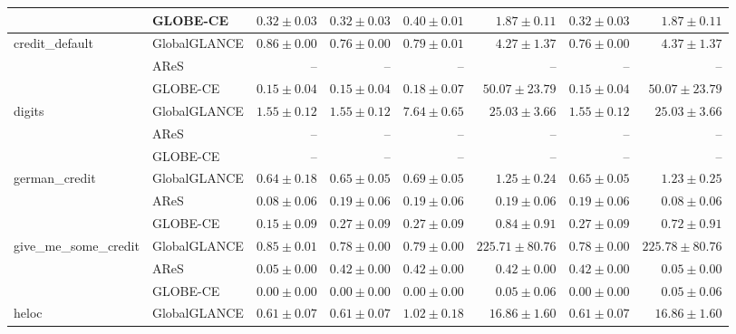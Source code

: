 \begin{table}[ht]
\begin{center}
\begin{sc}
\begin{scriptsize}
\begin{tabular}{l|l|rrrrrr}
 & GLOBE-CE & $\boldsymbol{0.32\pm{0.03}}$ & $\boldsymbol{0.32\pm{0.03}}$ & $\boldsymbol{0.40\pm{0.01}}$ & $\boldsymbol{1.87\pm{0.11}}$ & $\boldsymbol{0.32\pm{0.03}}$ & $\boldsymbol{1.87\pm{0.11}}$ \\
\midrule
\multirow{3}{*}{credit\_default} & GlobalGLANCE & $0.86\pm{0.00}$ & $0.76\pm{0.00}$ & $0.79\pm{0.01}$ & $\boldsymbol{4.27\pm{1.37}}$ & $0.76\pm{0.00}$ & $\boldsymbol{4.37\pm{1.37}}$ \\
 & AReS & -- & -- & -- & -- & -- & -- \\
 & GLOBE-CE & $\boldsymbol{0.15\pm{0.04}}$ & $\boldsymbol{0.15\pm{0.04}}$ & $\boldsymbol{0.18\pm{0.07}}$ & $50.07\pm{23.79}$ & $\boldsymbol{0.15\pm{0.04}}$ & $50.07\pm{23.79}$ \\
\midrule
\multirow{3}{*}{digits} & GlobalGLANCE & $\boldsymbol{1.55\pm{0.12}}$ & $\boldsymbol{1.55\pm{0.12}}$ & $\boldsymbol{7.64\pm{0.65}}$ & $\boldsymbol{25.03\pm{3.66}}$ & $\boldsymbol{1.55\pm{0.12}}$ & $\boldsymbol{25.03\pm{3.66}}$ \\
 & AReS & -- & -- & -- & -- & -- & -- \\
 & GLOBE-CE & -- & -- & -- & -- & -- & -- \\
\midrule
\multirow{3}{*}{german\_credit} & GlobalGLANCE & $0.64\pm{0.18}$ & $0.65\pm{0.05}$ & $0.69\pm{0.05}$ & $1.25\pm{0.24}$ & $0.65\pm{0.05}$ & $1.23\pm{0.25}$ \\
 & AReS & $\boldsymbol{0.08\pm{0.06}}$ & $\boldsymbol{0.19\pm{0.06}}$ & $\boldsymbol{0.19\pm{0.06}}$ & $\boldsymbol{0.19\pm{0.06}}$ & $\boldsymbol{0.19\pm{0.06}}$ & $\boldsymbol{0.08\pm{0.06}}$ \\
 & GLOBE-CE & $0.15\pm{0.09}$ & $0.27\pm{0.09}$ & $0.27\pm{0.09}$ & $0.84\pm{0.91}$ & $0.27\pm{0.09}$ & $0.72\pm{0.91}$ \\
\midrule
\multirow{3}{*}{give\_me\_some\_credit} & GlobalGLANCE & $0.85\pm{0.01}$ & $0.78\pm{0.00}$ & $0.79\pm{0.00}$ & $225.71\pm{80.76}$ & $0.78\pm{0.00}$ & $225.78\pm{80.76}$ \\
 & AReS & $0.05\pm{0.00}$ & $0.42\pm{0.00}$ & $0.42\pm{0.00}$ & $0.42\pm{0.00}$ & $0.42\pm{0.00}$ & $\boldsymbol{0.05\pm{0.00}}$ \\
 & GLOBE-CE & $\boldsymbol{0.00\pm{0.00}}$ & $\boldsymbol{0.00\pm{0.00}}$ & $\boldsymbol{0.00\pm{0.00}}$ & $\boldsymbol{0.05\pm{0.06}}$ & $\boldsymbol{0.00\pm{0.00}}$ & $\boldsymbol{0.05\pm{0.06}}$ \\
\midrule
\multirow{3}{*}{heloc} & GlobalGLANCE & $0.61\pm{0.07}$ & $0.61\pm{0.07}$ & $1.02\pm{0.18}$ & $16.86\pm{1.60}$ & $0.61\pm{0.07}$ & $16.86\pm{1.60}$ \\

\end{tabular}
\end{scriptsize}
\end{sc}
\end{center}
\end{table}
